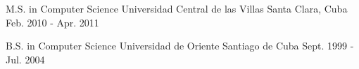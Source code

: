 


\begin{cventries}


\cventry
{M.S. in Computer Science} %
{Universidad Central de las Villas} %
{Santa Clara, Cuba} %
{Feb. 2010 - Apr. 2011} %
{ %
}


\cventry
{B.S. in Computer Science} %
{Universidad de Oriente} %
{Santiago de Cuba} %
{Sept. 1999 - Jul. 2004} %
{ %
}


\end{cventries}
